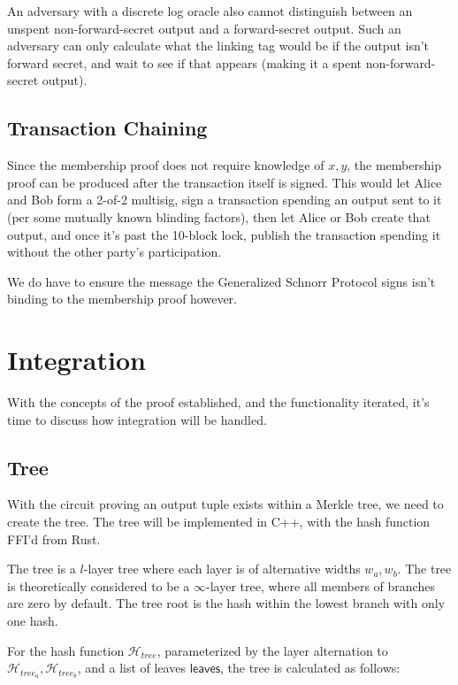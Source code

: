 \documentclass[]{article}
\begin{document}
An adversary with a discrete log oracle also cannot distinguish between an unspent non-forward-secret output and a forward-secret output. Such an adversary can only calculate what the linking tag would be if the output isn't forward secret, and wait to see if that appears (making it a spent non-forward-secret output).

\subsection{Transaction Chaining}

Since the membership proof does not require knowledge of $x, y$, the membership proof can be produced after the transaction itself is signed. This would let Alice and Bob form a 2-of-2 multisig, sign a transaction spending an output sent to it (per some mutually known blinding factors), then let Alice or Bob create that output, and once it's past the 10-block lock, publish the transaction spending it without the other party's participation.

We do have to ensure the message the Generalized Schnorr Protocol signs isn't binding to the membership proof however.

\newpage

\section{Integration}

With the concepts of the proof established, and the functionality iterated, it's time to discuss how integration will be handled.

\subsection{Tree}

With the circuit proving an output tuple exists within a Merkle tree, we need to create the tree. The tree will be implemented in C++, with the hash function FFI'd from Rust.

The tree is a $l$-layer tree where each layer is of alternative widths $w_a, w_b$. The tree is theoretically considered to be a $\infty$-layer tree, where all members of branches are zero by default. The tree root is the hash within the lowest branch with only one hash.

For the hash function $\mathcal{H}_{tree}$, parameterized by the layer alternation to $\mathcal{H}_{tree_a}, \mathcal{H}_{tree_b}$, and a list of leaves $\mathsf{leaves}$, the tree is calculated as follows:
\end{document}
